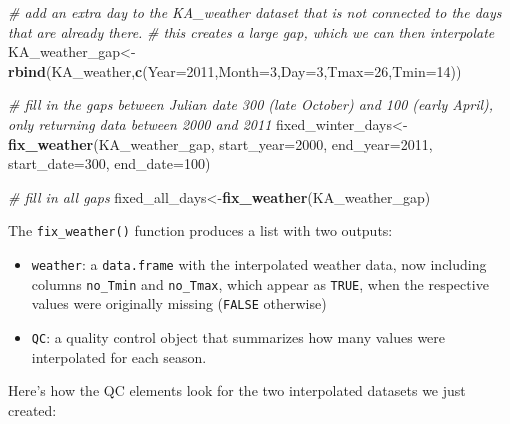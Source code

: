 \documentclass[
]{book}
\newenvironment{Shaded}{\begin{snugshade}}{\end{snugshade}}
\newcommand{\CommentTok}[1]{\textcolor[rgb]{0.56,0.35,0.01}{\textit{#1}}}
\newcommand{\DataTypeTok}[1]{\textcolor[rgb]{0.13,0.29,0.53}{#1}}
\newcommand{\DecValTok}[1]{\textcolor[rgb]{0.00,0.00,0.81}{#1}}
\newcommand{\KeywordTok}[1]{\textcolor[rgb]{0.13,0.29,0.53}{\textbf{#1}}}
\newcommand{\NormalTok}[1]{#1}
\newcommand{\OperatorTok}[1]{\textcolor[rgb]{0.81,0.36,0.00}{\textbf{#1}}}
\newcommand{\StringTok}[1]{\textcolor[rgb]{0.31,0.60,0.02}{#1}}
\begin{document}
\begin{Shaded}
\begin{Highlighting}[]
\CommentTok{# add an extra day to the KA_weather dataset that is not connected to the days that are already there.}
\CommentTok{# this creates a large gap, which we can then interpolate}
\NormalTok{KA_weather_gap<-}\KeywordTok{rbind}\NormalTok{(KA_weather,}\KeywordTok{c}\NormalTok{(}\DataTypeTok{Year=}\DecValTok{2011}\NormalTok{,}\DataTypeTok{Month=}\DecValTok{3}\NormalTok{,}\DataTypeTok{Day=}\DecValTok{3}\NormalTok{,}\DataTypeTok{Tmax=}\DecValTok{26}\NormalTok{,}\DataTypeTok{Tmin=}\DecValTok{14}\NormalTok{)) }

\CommentTok{# fill in the gaps between Julian date 300 (late October) and 100 (early April), only returning data between 2000 and 2011}
\NormalTok{fixed_winter_days<-}\KeywordTok{fix_weather}\NormalTok{(KA_weather_gap, }\DataTypeTok{start_year=}\DecValTok{2000}\NormalTok{, }\DataTypeTok{end_year=}\DecValTok{2011}\NormalTok{, }\DataTypeTok{start_date=}\DecValTok{300}\NormalTok{, }\DataTypeTok{end_date=}\DecValTok{100}\NormalTok{)}

\CommentTok{# fill in all gaps}
\NormalTok{fixed_all_days<-}\KeywordTok{fix_weather}\NormalTok{(KA_weather_gap)}
\end{Highlighting}
\end{Shaded}

The \texttt{fix\_weather()} function produces a list with two outputs:

\begin{itemize}
\item
  \texttt{weather}: a \texttt{data.frame} with the interpolated weather data, now including columns \texttt{no\_Tmin} and \texttt{no\_Tmax}, which appear as \texttt{TRUE}, when the respective values were originally missing (\texttt{FALSE} otherwise)
\item
  \texttt{QC}: a quality control object that summarizes how many values were interpolated for each season.
\end{itemize}

Here's how the QC elements look for the two interpolated datasets we just created:

\begin{Shaded}
\end{Shaded}
\end{document}
